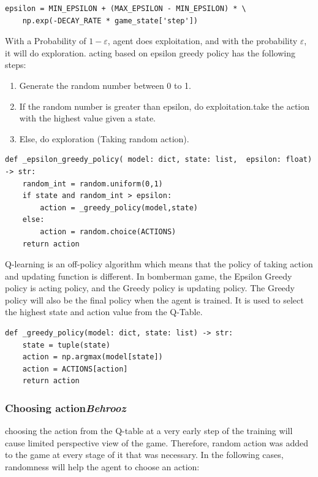 \documentclass{article}
\begin{document}
\begin{verbatim}
epsilon = MIN_EPSILON + (MAX_EPSILON - MIN_EPSILON) * \
    np.exp(-DECAY_RATE * game_state['step'])
\end{verbatim}

With a Probability of $1 - \varepsilon$, agent does exploitation, and with the probability $\varepsilon$, it will do exploration.
acting based on epsilon greedy policy has the following steps:

\begin{enumerate}
    \item Generate the random number between 0 to 1.
    \item If the random number is greater than epsilon, do exploitation.take the action with the highest value given a state.
    \item Else, do exploration (Taking random action).
\end{enumerate}



\begin{verbatim}
def _epsilon_greedy_policy( model: dict, state: list,  epsilon: float) -> str:
    random_int = random.uniform(0,1)
    if state and random_int > epsilon:
        action = _greedy_policy(model,state)
    else:
        action = random.choice(ACTIONS)
    return action
\end{verbatim}

Q-learning is an off-policy algorithm which means that the policy of taking action and updating function is different.
In bomberman game, the Epsilon Greedy policy is acting policy, and the Greedy policy is updating policy.
The Greedy policy will also be the final policy when the agent is trained. It is used to select the highest state and action value from the Q-Table.

\begin{verbatim}
def _greedy_policy(model: dict, state: list) -> str:
    state = tuple(state)
    action = np.argmax(model[state])
    action = ACTIONS[action]
    return action
\end{verbatim}


\subsubsection[Choosing action]{Choosing action{\normalsize \normalfont \it \hfill Behrooz}}

choosing the action from the Q-table at a very early step of the training will cause limited perspective view of the game. Therefore, random action was added to the game at every stage of it that was necessary. In the following cases, randomness will help the agent to choose an action:
\end{document}

